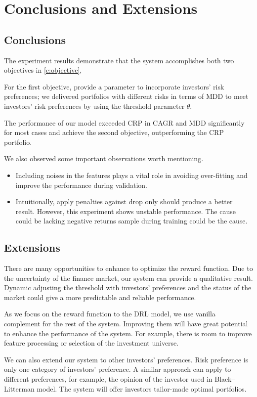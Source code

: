 \chapter{Conclusions and Extensions}
\label{c:conclusion}
\section{Conclusions}
The experiment results demonstrate that the system accomplishes both two objectives in \autoref{c:objective},
\par
For the first objective, provide a parameter to incorporate investors' risk preferences; we delivered portfolios with different risks in terms of MDD to meet investors' risk preferences by using the threshold parameter $\theta$.
\par
The performance of our model exceeded CRP in CAGR and MDD significantly for most cases and achieve the second objective, outperforming the CRP portfolio.
\par
We also observed some important observations worth mentioning.
\begin{itemize}
    \item Including noises in the features plays a vital role in avoiding over-fitting and improve the performance during validation. 
    \item Intuitionally, apply penalties against drop only should produce a better result. However, this experiment shows unstable performance. The cause could be lacking negative returns sample during training could be the cause.
\end{itemize}

\section{Extensions}
There are many opportunities to enhance to optimize the reward function. Due to the uncertainty of the finance market, our system can provide a qualitative result. Dynamic adjusting the threshold with investors' preferences and the status of the market could give a more predictable and reliable performance.

As we focus on the reward function to the DRL model, we use vanilla complement for the rest of the system. Improving them will have great potential to enhance the performance of the system. For example, there is room to improve feature processing or selection of the investment universe.

\par
We can also extend our system to other investors' preferences. Risk preference is only one category of investors' preference. A similar approach can apply to different preferences, for example, the opinion of the investor used in Black–Litterman model\cite{black1992global}. The system will offer investors tailor-made optimal portfolios.